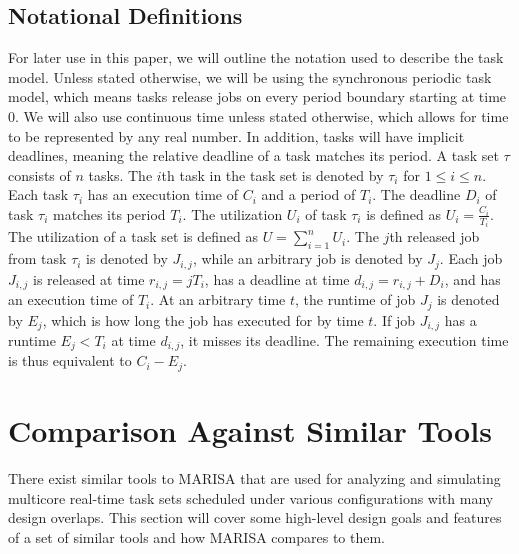 \documentclass[conference,compsoc]{IEEEtran}
\begin{document}
\subsection{Notational Definitions}
For later use in this paper, we will outline the notation used to describe the task model. Unless stated otherwise, we will be using the synchronous periodic task model, which means tasks release jobs on every period boundary starting at time $0$. We will also use continuous time unless stated otherwise, which allows for time to be represented by any real number. In addition, tasks will have implicit deadlines, meaning the relative deadline of a task matches its period. A task set $\tau$ consists of $n$ tasks. The $i$th task in the task set is denoted by $\tau_i$ for $1 \leq i \leq n$. Each task $\tau_i$ has an execution time of $C_i$ and a period of $T_i$. The deadline $D_i$ of task $\tau_i$ matches its period $T_i$. The utilization $U_i$ of task $\tau_i$ is defined as $U_i = \frac{C_i}{T_i}$. The utilization of a task set is defined as $U = \sum_{i=1}^nU_i$. The $j$th released job from task $\tau_i$ is denoted by $J_{i,j}$, while an arbitrary job is denoted by $J_j$. Each job $J_{i,j}$ is released at time $r_{i,j} = jT_i$, has a deadline at time $d_{i,j} = r_{i,j} + D_i$, and has an execution time of $T_i$. At an arbitrary time $t$, the runtime of job $J_j$ is denoted by $E_j$, which is how long the job has executed for by time $t$. If job $J_{i,j}$ has a runtime $E_j < T_i$ at time $d_{i,j}$, it misses its deadline. The remaining execution time is thus equivalent to $C_i - E_j$.

\section{Comparison Against Similar Tools}
There exist similar tools to MARISA that are used for analyzing and simulating multicore real-time task sets scheduled under various configurations with many design overlaps. This section will cover some high-level design goals and features of a set of similar tools and how MARISA compares to them.
\end{document}
